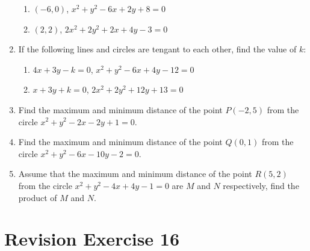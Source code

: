 \documentclass{report}
\begin{document}
\begin{multicols}{2}
\begin{enumerate}
\begin{enumerate}
                  \item $(-6, 0)$, $x^2 + y^2 - 6x + 2y + 8 = 0$
                  \item $(2, 2)$, $2x^2 + 2y^2 + 2x + 4y - 3 = 0$
              \end{enumerate}
        \item If the following lines and circles are tengant to each other, find the value of
              $k$:
              \begin{enumerate}
                  \item $4x + 3y - k = 0$, $x^2 + y^2 - 6x + 4y - 12 = 0$
                  \item $x + 3y + k = 0$, $2x^2 + 2y^2 + 12y + 13 = 0$
              \end{enumerate}
        \item Find the maximum and minimum distance of the point $P(-2, 5)$ from the circle
              $x^2 + y^2 - 2x - 2y + 1 = 0$.
        \item Find the maximum and minimum distance of the point $Q(0, 1)$ from the circle
              $x^2 + y^2 - 6x - 10y - 2 = 0$.
        \item Assume that the maximum and minimum distance of the point $R(5, 2)$ from the
              circle $x^2 + y^2 - 4x + 4y - 1 = 0$ are $M$ and $N$ respectively, find the
              product of $M$ and $N$.
    \end{enumerate}

    \section{Revision Exercise 16}


\end{multicols}
\end{document}
